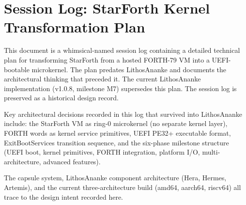 
\section{Session Log: StarForth Kernel Transformation Plan}

This document is a whimsical-named session log containing a detailed
technical plan for transforming StarForth from a hosted FORTH-79 VM into
a UEFI-bootable microkernel. The plan predates LithosAnanke and documents
the architectural thinking that preceded it. The current LithosAnanke
implementation (v1.0.8, milestone M7) supersedes this plan. The session
log is preserved as a historical design record.

Key architectural decisions recorded in this log that survived into
LithosAnanke include: the StarForth VM as ring-0 microkernel (no separate
kernel layer), FORTH words as kernel service primitives, UEFI PE32+
executable format, ExitBootServices transition sequence, and the
six-phase milestone structure (UEFI boot, kernel primitives, FORTH
integration, platform I/O, multi-architecture, advanced features).

The capsule system, LithosAnanke component architecture (Hera, Hermes,
Artemis), and the current three-architecture build (amd64, aarch64,
riscv64) all trace to the design intent recorded here.

